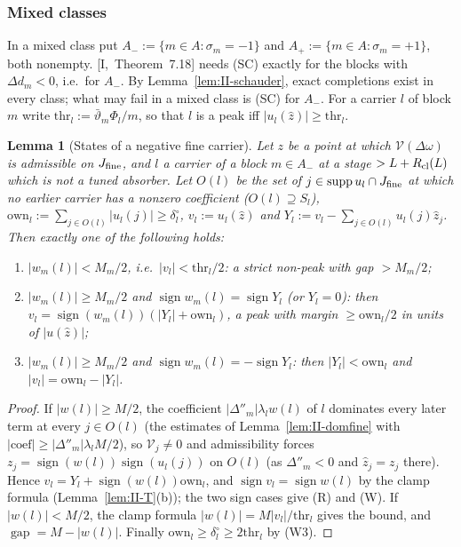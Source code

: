 \documentclass[10pt]{amsart}
\newtheorem{lemma}[theorem]{Lemma}
\theoremstyle{definition}
\theoremstyle{remark}
\newcommand{\supp}{\operatorname{supp}}
\newcommand{\sgn}{\operatorname{sign}}
\newcommand{\gap}{\operatorname{gap}}
\newcommand{\zh}{\hat z}
\begin{document}
\subsubsection*{Mixed classes}

In a mixed class put $A_-:=\{m\in A:\sigma_m=-1\}$ and $A_+:=\{m\in A:\sigma_m=+1\}$, both
nonempty.  [I,~Theorem~7.18] needs (SC) exactly for the blocks with $\Delta d_m<0$,
i.e.\ for $A_-$.  By Lemma~\ref{lem:II-schauder}, exact completions exist in every
class; what may fail in a mixed class is (SC) for $A_-$.  For a carrier $l$ of
block $m$ write $\mathrm{thr}_l:=\bar\vartheta_m\Phi_l/m$, so that $l$ is a peak iff $|u_l(\zh)|\ge
\mathrm{thr}_l$.

\begin{lemma}[States of a negative fine carrier]\label{lem:II-states}
Let $z$ be a point at which $\mathcal V(\Delta\omega)$ is admissible on $J_{\rm fine}$, and $l$ a
carrier of a block $m\in A_-$ at a stage $>L+R_{\rm cl}(L)$ which is not a tuned absorber.
Let $O(l)$ be the set of $j\in\supp u_l\cap J_{\rm fine}$ at which no earlier carrier has a
nonzero coefficient \textup{(}$O(l)\supseteq S_l$\textup{)}, $\mathrm{own}_l:=\sum_{j\in O(l)}
|u_l(j)|\ge\delta^\circ_l$, $v_l:=u_l(\zh)$ and $Y_l:=v_l-\sum_{j\in O(l)}u_l(j)\zh_j$.  Then
exactly one of the following holds:
\begin{enumerate}
\item[(Z$'$)] $|w_m(l)|<M_m/2$, i.e.\ $|v_l|<\mathrm{thr}_l/2$: a strict non-peak with gap
$>M_m/2$;
\item[(R)] $|w_m(l)|\ge M_m/2$ and $\sgn w_m(l)=\sgn Y_l$ \textup{(}or $Y_l=0$\textup{)}: then
$v_l=\sgn(w_m(l))(|Y_l|+\mathrm{own}_l)$, a peak with margin $\ge\mathrm{own}_l/2$ in units of
$|u(\zh)|$;
\item[(W)] $|w_m(l)|\ge M_m/2$ and $\sgn w_m(l)=-\sgn Y_l$: then $|Y_l|<\mathrm{own}_l$ and
$|v_l|=\mathrm{own}_l-|Y_l|$.
\end{enumerate}
\end{lemma}

\begin{proof}
If $|w(l)|\ge M/2$, the coefficient $|\Delta''_m|\lambda_lw(l)$ of $l$ dominates every later
term at every $j\in O(l)$ (the estimates of Lemma~\ref{lem:II-domfine} with $|\mathrm{coef}|
\ge|\Delta''_m|\lambda_lM/2$), so $\mathcal V_j\ne0$ and admissibility forces $z_j=\sgn(w(l))
\sgn(u_l(j))$ on $O(l)$ (as $\Delta''_m<0$ and $\zh_j=z_j$ there).  Hence $v_l=Y_l+
\sgn(w(l))\mathrm{own}_l$, and $\sgn v_l=\sgn w(l)$ by the clamp formula
(Lemma~\ref{lem:II-T}(b)); the two sign cases give (R) and (W).  If $|w(l)|<M/2$, the
clamp formula $|w(l)|=M|v_l|/\mathrm{thr}_l$ gives the bound, and $\gap=M-|w(l)|$.
Finally $\mathrm{own}_l\ge\delta^\circ_l\ge2\mathrm{thr}_l$ by (W3).
\end{proof}
\end{document}
